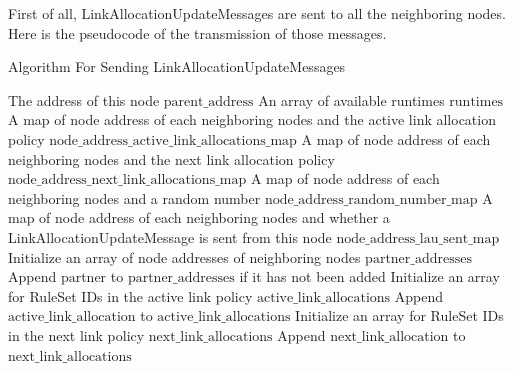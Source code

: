 First of all, LinkAllocationUpdateMessages are sent to all the neighboring nodes. Here is the pseudocode of the transmission of those messages.

\begin{algorithm}[H]
  \caption{Algorithm For Sending LinkAllocationUpdateMessages}
  \begin{algorithmic}[1]
\Require The address of this node $\text{parent\_address}$
  \Require An array of available runtimes $\text{runtimes}$
  \Require A map of node address of each neighboring nodes and the active link allocation policy $\text{node\_address\_active\_link\_allocations\_map}$
  \Require A map of node address of each neighboring nodes and the next link allocation policy $\text{node\_address\_next\_link\_allocations\_map}$
  \Require A map of node address of each neighboring nodes and a random number $\text{node\_address\_random\_number\_map}$
  \Require A map of node address of each neighboring nodes and whether a LinkAllocationUpdateMessage is sent from this node $\text{node\_address\_lau\_sent\_map}$
    \State Initialize an array of node addresses of neighboring nodes $\text{partner\_addresses}$
      \State Append $\text{partner}$ to $\text{partner\_addresses}$ if it has not been added
      \EndFor
    \EndFor
      \State Initialize an array for RuleSet IDs in the active link policy $\text{active\_link\_allocations}$
            \State Append $\text{active\_link\_allocation}$ to $\text{active\_link\_allocations}$
          \EndFor
        \EndIf
      \State Initialize an array for RuleSet IDs in the next link policy $\text{next\_link\_allocations}$
            \State Append $\text{next\_link\_allocation}$ to $\text{next\_link\_allocations}$
          \EndFor
        \EndIf
        \EndFor
        \EndFor
      \EndFor
    \end{algorithmic}
  \end{algorithm}

